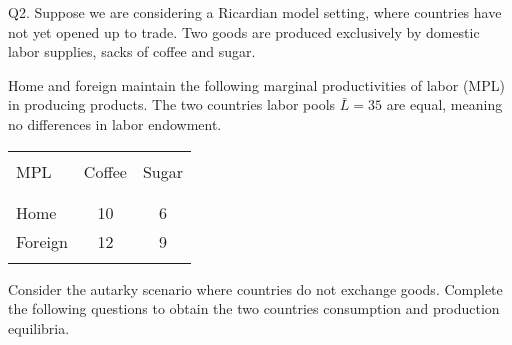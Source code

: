 \documentclass[12pt]{article}
\begin{document}
\noindent Q2. Suppose we are considering a Ricardian model setting, where countries have not yet opened up to trade.
Two goods are produced exclusively by domestic labor supplies, sacks of coffee and sugar. 

\noindent Home and foreign maintain the following marginal productivities of labor (MPL) in producing products. The two countries labor pools $\bar{L}=35$ are equal, meaning no differences in labor endowment.

\begin{table}[!h]
	\centering
	\begin{tabular}[t]{l c c }
		\hline
		&&\\
		MPL & Coffee & Sugar  \\
		&&\\
		\hline
		&&\\
		Home & 10 & 6  \\
		Foreign & 12 & 9 \\
		&&\\
		\hline
	\end{tabular}
\end{table}



Consider the autarky scenario where countries do not exchange goods. Complete the following questions to obtain the two countries consumption and production equilibria. 
\end{document}
